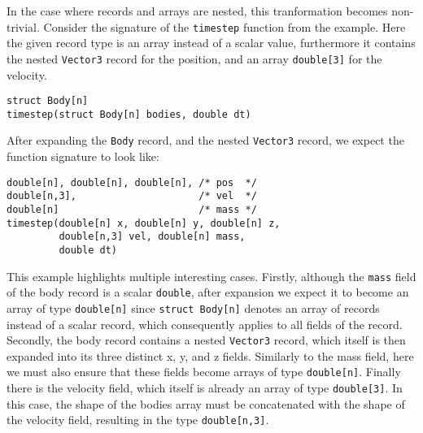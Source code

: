 In the case where records and arrays are nested, this tranformation becomes non-trivial.
Consider the signature of the \texttt{timestep} function from the example.
Here the given record type is an array instead of a scalar value, furthermore it contains the nested \texttt{Vector3} record for the position, and an array \texttt{double[3]} for the velocity.
%
\begin{lstlisting}
struct Body[n]
timestep(struct Body[n] bodies, double dt)
\end{lstlisting}
%
After expanding the \texttt{Body} record, and the nested \texttt{Vector3} record, we expect the function signature to look like:
%
\begin{lstlisting}
double[n], double[n], double[n], /* pos  */
double[n,3],                     /* vel  */
double[n]                        /* mass */
timestep(double[n] x, double[n] y, double[n] z,
         double[n,3] vel, double[n] mass,
         double dt)
\end{lstlisting}
%
This example highlights multiple interesting cases.
Firstly, although the \texttt{mass} field of the body record is a scalar \texttt{double}, after expansion we expect it to become an array of type \texttt{double[n]} since \texttt{struct Body[n]} denotes an array of records instead of a scalar record, which consequently applies to all fields of the record.
Secondly, the body record contains a nested \texttt{Vector3} record, which itself is then expanded into its three distinct x, y, and z fields.
Similarly to the mass field, here we must also ensure that these fields become arrays of type \texttt{double[n]}.
Finally there is the velocity field, which itself is already an array of type \texttt{double[3]}.
In this case, the shape of the bodies array must be concatenated with the shape of the velocity field, resulting in the type \texttt{double[n,3]}.
